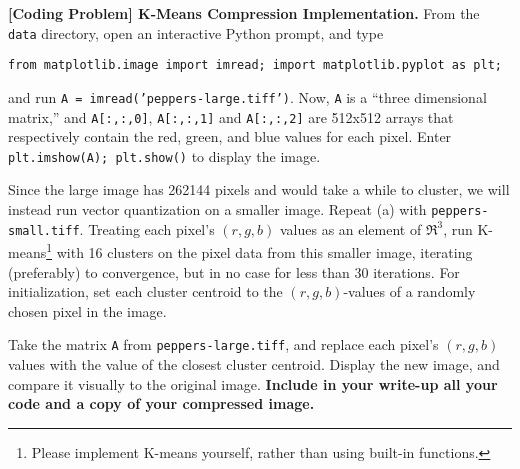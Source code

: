 \item{}
\textbf{[Coding Problem] K-Means Compression Implementation.}
From the \texttt{data} directory, open an interactive Python prompt, and type
%
\begin{center}
  \texttt{from matplotlib.image import imread; import matplotlib.pyplot as plt;}
\end{center}
%
and run \texttt{A = imread('peppers-large.tiff')}. Now, \texttt{A} is a ``three
dimensional matrix,'' and \texttt{A[:,:,0]}, \texttt{A[:,:,1]} and
\texttt{A[:,:,2]} are 512x512 arrays that respectively contain the
red, green, and blue values for each pixel. Enter {\tt plt.imshow(A); plt.show()} to
display the image.

Since the large image has 262144 pixels and would take a while
to cluster, we will instead run vector quantization on a smaller
image. Repeat (a) with {\tt peppers-small.tiff}.  Treating each
pixel's $(r, g, b)$ values as an element of $\Re^3$, run K-means\footnote{
Please implement K-means yourself, rather than using built-in functions.}
with 16 clusters on the pixel data from this smaller image,
iterating (preferably) to convergence, but in no case for less than
30 iterations. For initialization, set each cluster centroid to the
$(r, g, b)$-values of a randomly chosen pixel in the image.

Take the matrix \texttt{A} from \texttt{peppers-large.tiff}, and
replace each pixel's $(r, g, b)$ values with the value of the closest
cluster centroid. Display the new image, and compare it visually to
the original image. \textbf{Include in your write-up all your code and a copy of your
compressed image.}

\ifnum{} {
  
} \fi
